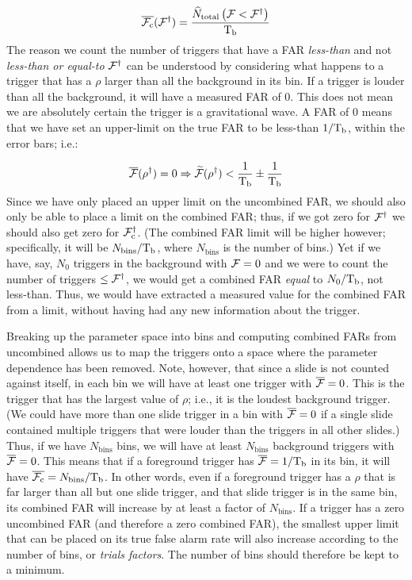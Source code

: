 \begin{equation}
\label{eqn:cfar_1}
\overline{\cfar}( \far^\dagger ) = \frac{ \widehat{N}_{\mathrm{total}}\left( \far < \far^\dagger \right) }{\Tb}
\end{equation}
The reason we count the number of triggers that have a \ac{FAR} \emph{less-than} and not \emph{less-than or equal-to} $\mathcal{F}^\dagger$ can be understood by considering what happens to a trigger that has a $\rho$ larger than all the background in its bin. If a trigger is louder than all the background, it will have a measured \ac{FAR} of 0. This does not mean we are absolutely certain the trigger is a gravitational wave. A \ac{FAR} of 0 means that we have set an upper-limit on the true \ac{FAR} to be less-than $1/\mathrm{T_b}$, within the error bars; i.e.:

\begin{equation}
\label{eqn:zeroFAR}
\overline{\far}(\rho^\dagger) = 0 \Rightarrow \widetilde{\far}(\rho^\dagger) < \frac{1}{\Tb} \pm \frac{1}{\Tb}
\end{equation}
Since we have only placed an upper limit on the uncombined \ac{FAR}, we should also only be able to place a limit on the combined \ac{FAR}; thus, if we got zero for $\mathcal{F}^\dagger$ we should also get zero for $\mathcal{F}_{\mathrm{c}}^\dagger$. (The combined \ac{FAR} limit will be higher however; specifically, it will be $N_{\mathrm{bins}}/\mathrm{T_b}$, where $N_{\mathrm{bins}}$ is the number of bins.) Yet if we have, say, $N_0$ triggers in the background with $\mathcal{F} = 0$ and we were to count the number of triggers $\leq \mathcal{F}^\dagger$, we would get a combined \ac{FAR} \emph{equal} to $N_0/\mathrm{T_b}$, not less-than. Thus, we would have extracted a measured value for the combined \ac{FAR} from a limit, without having had any new information about the trigger.

Breaking up the parameter space into bins and computing combined \acp{FAR} from uncombined allows us to map the triggers onto a space where the parameter dependence has been removed. Note, however, that since a slide is not counted against itself, in each bin we will have at least one trigger with $\overline{\mathcal{F}} = 0$. This is the trigger that has the largest value of $\rho$; i.e., it is the loudest background trigger. (We could have more than one slide trigger in a bin with $\overline{\mathcal{F}} = 0$ if a single slide contained multiple triggers that were louder than the triggers in all other slides.) Thus, if we have $N_{\mathrm{bins}}$ bins, we will have at least $N_{\mathrm{bins}}$ background triggers with $\overline{\mathcal{F}} = 0$. This means that if a foreground trigger has $\overline{\mathcal{F}} = 1/\mathrm{T_b}$ in its bin, it will have $\overline{\mathcal{F}_{\mathrm{c}}} = N_{\mathrm{bins}}/\mathrm{T_b}$. In other words, even if a foreground trigger has a $\rho$ that is far larger than all but one slide trigger, and that slide trigger is in the same bin, its combined \ac{FAR} will increase by at least a factor of $N_{\mathrm{bins}}$. If a trigger has a zero uncombined \ac{FAR} (and therefore a zero combined \ac{FAR}), the smallest upper limit that can be placed on its true false alarm rate will also increase according to the number of bins, or \emph{trials factors}. The number of bins should therefore be kept to a minimum.

